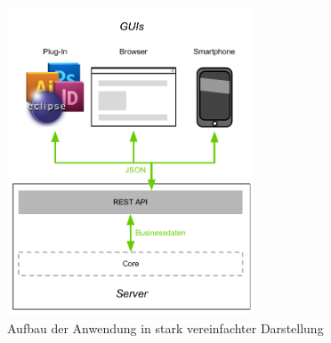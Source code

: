 \begin{figure}[htb]
\begin{center}
\includegraphics[width=0.65\textwidth]{media/ArtdesSystems.pdf}
\caption{Aufbau der Anwendung in stark vereinfachter Darstellung}
\label{chart:aufbaudessystems}
\end{center}
\end{figure}

